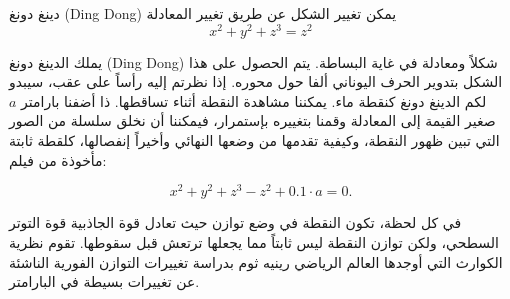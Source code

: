 \begin{surferPage}{دينغ دونغ (Ding Dong)}
يمكن تغيير الشكل عن طريق تغيير المعادلة\\

\smallskip
\[x^2	+ y^2	+ z^3	= z^2\]

\singlespacing
يملك الدينغ دونغ (Ding Dong) شكلاً ومعادلة في غاية البساطة.  يتم الحصول على هذا الشكل بتدوير الحرف اليوناني ألفا حول محوره. إذا نظرتم إليه رأساً على عقب، سيبدو لكم الدينغ دونغ كنقطة ماء. يمكننا مشاهدة النقطة أثناء تساقطها.
\newline
ذا أضفنا بارامتر  $a$  صغير القيمة إلى المعادلة وقمنا بتغييره بإستمرار، فيمكننا أن نخلق سلسلة من الصور التي تبين ظهور النقطة، وكيفية تقدمها من وضعها النهائي وأخيراً إنفصالها، كلقطة ثابتة مأخوذة من فيلم: 


\[x^2	+ y^2	+ z^3	-z^2+0.1\cdot a=0.\]

في كل لحظة، تكون النقطة في وضع توازن حيث تعادل قوة الجاذبية قوة التوتر السطحي، ولكن توازن النقطة ليس ثابتاً مما يجعلها ترتعش قبل سقوطها. تقوم نظرية الكوارث التي أوجدها العالم الرياضي رينيه ثوم بدراسة تغييرات التوازن الفورية الناشئة عن تغييرات بسيطة في البارامتر.
\end{surferPage} 